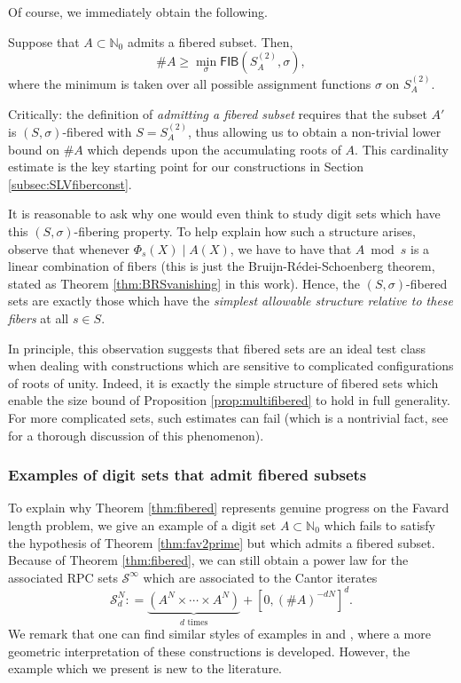 \documentclass[12pt]{amsart}
\numberwithin{equation}{section}
\begin{document}
Of course, we immediately obtain the following.

\begin{corollary}\label{cor:multifibered}
Suppose that $A \subset \mathbb{N}_0$ admits a fibered subset. Then,
$$
\# A \geq \min_{\sigma} \mathsf{FIB}(S_A^{(2)}, \sigma),
$$
where the minimum is taken over all possible assignment functions $\sigma$ on $S_A^{(2)}$.
\end{corollary}

Critically: the definition of \textit{admitting a fibered subset} requires that the subset $A'$ is $(S,\sigma)$-fibered with $S = S_A^{(2)}$,  thus allowing us to obtain a non-trivial lower bound on $\#A$ which depends upon the accumulating roots of $A$. This cardinality estimate is the key starting point for our constructions in Section \ref{subsec:SLVfiberconst}.

\begin{remark}
    \rm{
    It is reasonable to ask why one would even think to study digit sets which have this $(S,\sigma)$-fibering property. To help explain how such a structure arises, observe that whenever $\Phi_s (X) \mid A(X)$, we have to have that $A \bmod s$ is a linear combination of fibers (this is just the Bruijn-R{\'e}dei-Schoenberg theorem, stated as Theorem \ref{thm:BRSvanishing} in this work). Hence, the $(S,\sigma)$-fibered sets are exactly those which have the \textit{simplest allowable structure relative to these fibers} at all $s \in S$. 
    
    In principle, this observation suggests that fibered sets are an ideal test class when dealing with constructions which are sensitive to complicated configurations of roots of unity. Indeed, it is exactly the simple structure of fibered sets which enable the size bound of Proposition \ref{prop:multifibered} to hold in full generality. For more complicated sets, such estimates can fail (which is a nontrivial fact, see \cite{KLMS} for a thorough discussion of this phenomenon).
    }
\end{remark}
    


\subsubsection{Examples of digit sets that admit fibered subsets}
To explain why Theorem \ref{thm:fibered} represents genuine progress on the Favard length problem, we give an example of a digit set $A \subset \mathbb{N}_0$ which fails to satisfy the hypothesis of Theorem \ref{thm:fav2prime} but which admits a fibered subset. Because of Theorem \ref{thm:fibered}, we can still obtain a power law for the associated RPC sets $\mathcal{S}^{\infty}$ which are associated to the Cantor iterates
$$
\mathcal{S}_d^{N} : = \underbrace{(A^N \times \cdots \times A^N)}_{d \textrm{ times}} + [0, (\# A)^{-dN}]^d.
$$
We remark that one can find similar styles of examples in \cite[Section 8]{KLMS} and \cite[Section 7]{LM}, where a more geometric interpretation of these constructions is developed. However, the example which we present is new to the literature.
\end{document}
